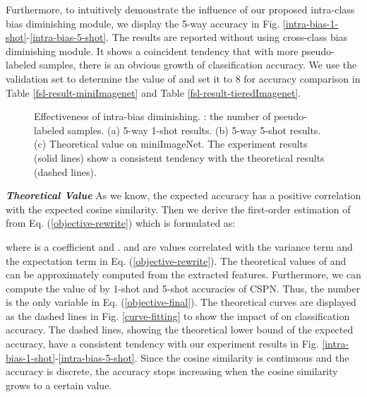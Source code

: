 \documentclass[runningheads]{llncs}
\begin{document}
Furthermore, to intuitively demonstrate the influence of our proposed intra-class bias diminishing module, we display the 5-way accuracy in Fig. \ref{intra-bias-1-shot}-\ref{intra-bias-5-shot}. The results are reported without using cross-class bias diminishing module.
It shows a coincident tendency that with more pseudo-labeled samples, there is an obvious growth of classification accuracy. We use the validation set to determine the value of  and set it to 8 for accuracy comparison in Table \ref{fsl-result-miniImagenet} and Table \ref{fsl-result-tieredImagenet}. 

\begin{figure*}
\centering
{}\caption{Effectiveness of intra-bias diminishing. : the number of pseudo-labeled samples. (a) 5-way 1-shot results. (b) 5-way 5-shot results. (c) Theoretical value on miniImageNet. The experiment results (solid lines) show a consistent tendency with the theoretical results (dashed lines). }
\label{intra-bias-comparison}
\end{figure*}

\textbf{\textit{Theoretical Value}}
As we know, the expected accuracy  has a positive correlation with the expected cosine similarity. Then we derive the first-order estimation of  from Eq. (\ref{objective-rewrite}) which is formulated as:

where  is a coefficient and .  and  are values correlated with the variance term and the expectation term in Eq. (\ref{objective-rewrite}). The theoretical values of  and  can be approximately computed from the extracted features. Furthermore, we can compute the value of  by 1-shot and 5-shot accuracies of CSPN. Thus, the number  is the only variable in Eq. (\ref{objective-final}). The theoretical curves are displayed as the dashed lines in Fig. \ref{curve-fitting} to show the impact of  on classification accuracy. The dashed lines, showing the theoretical lower bound of the expected accuracy, have a consistent tendency with our experiment results in Fig. \ref{intra-bias-1-shot}-\ref{intra-bias-5-shot}. Since the cosine similarity is continuous and the accuracy is discrete, the accuracy stops increasing when the cosine similarity grows to a certain value.
\end{document}
